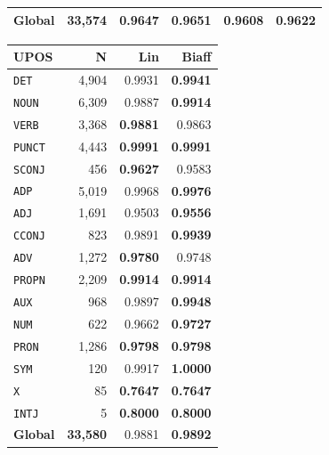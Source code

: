 \begin{table}[ht]
\begin{minipage}[t]{0.60\linewidth}
\begin{tabular}{l r  r r r r}
\midrule
\textbf{Global} & \textbf{33,574} & 0.9647 & \textbf{0.9651} & 0.9608 & 0.9622 \\
\bottomrule
\end{tabular}
\end{minipage}
\hfill
\begin{minipage}[t]{0.37\linewidth}
\centering
\begin{tabular}{l r  r r}
\toprule
\textbf{UPOS} & \textbf{N} & \textbf{Lin} & \textbf{Biaff} \\
\midrule
\texttt{DET} & 4,904 & 0.9931 & \textbf{0.9941} \\
\texttt{NOUN} & 6,309 & 0.9887 & \textbf{0.9914} \\
\texttt{VERB} & 3,368 & \textbf{0.9881} & 0.9863 \\
\texttt{PUNCT} & 4,443 & \textbf{0.9991} & \textbf{0.9991} \\
\texttt{SCONJ} & 456 & \textbf{0.9627} & 0.9583 \\
\texttt{ADP} & 5,019 & 0.9968 & \textbf{0.9976} \\
\texttt{ADJ} & 1,691 & 0.9503 & \textbf{0.9556} \\
\texttt{CCONJ} & 823 & 0.9891 & \textbf{0.9939} \\
\texttt{ADV} & 1,272 & \textbf{0.9780} & 0.9748 \\
\texttt{PROPN} & 2,209 & \textbf{0.9914} & \textbf{0.9914} \\
\texttt{AUX} & 968 & 0.9897 & \textbf{0.9948} \\
\texttt{NUM} & 622 & 0.9662 & \textbf{0.9727} \\
\texttt{PRON} & 1,286 & \textbf{0.9798} & \textbf{0.9798} \\
\texttt{SYM} & 120 & 0.9917 & \textbf{1.0000} \\
\texttt{X} & 85 & \textbf{0.7647} & \textbf{0.7647} \\
\texttt{INTJ} & 5 & \textbf{0.8000} & \textbf{0.8000} \\
\midrule
\textbf{Global} & \textbf{33,580} & 0.9881 & \textbf{0.9892} \\
\bottomrule
\end{tabular}
\end{minipage}
\end{table}



